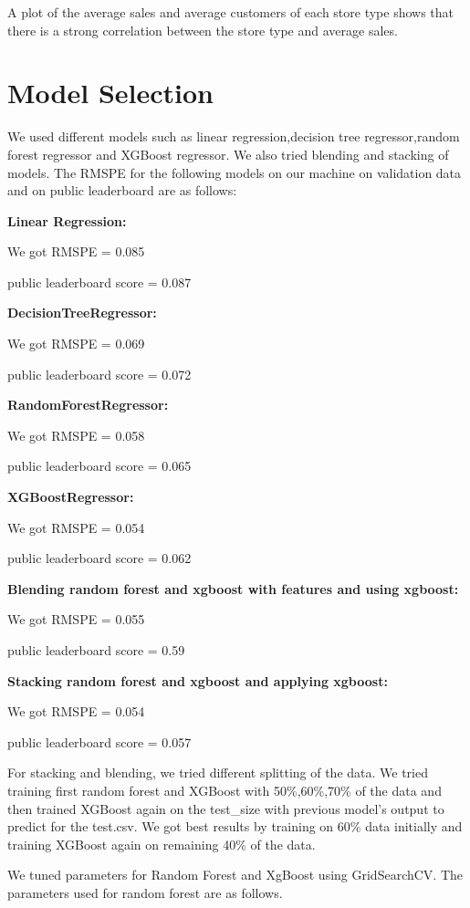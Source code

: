 \documentclass[letterpaper, 10 pt, conference]{ieeeconf}  %
\begin{document}
A plot of the average sales and average customers of each store type shows that there is a strong correlation between the store type and average sales.

\section{Model Selection}
We used different models such as linear regression,decision tree regressor,random forest regressor and XGBoost regressor. We also tried blending and stacking of models. The RMSPE for the following models on our machine on validation data and on public leaderboard are as follows:
\bigskip

\textbf{Linear Regression:}

We got RMSPE = 0.085

public leaderboard score = 0.087
\bigskip

\textbf{DecisionTreeRegressor:}

We got RMSPE = 0.069

public leaderboard score = 0.072
\bigskip

\textbf{RandomForestRegressor:}

We got RMSPE = 0.058

public leaderboard score = 0.065

\bigskip
\textbf{XGBoostRegressor:}

We got RMSPE = 0.054

public leaderboard score = 0.062

\bigskip
\textbf{Blending random forest and xgboost with features and using xgboost:}

We got RMSPE = 0.055

public leaderboard score = 0.59

\bigskip
\textbf{Stacking random forest and xgboost and applying xgboost:}

We got RMSPE = 0.054

public leaderboard score = 0.057

\bigskip

For stacking and blending, we tried different splitting of the data. We tried training first random forest and XGBoost with 50\%,60\%,70\% of the data and then trained XGBoost again on the test\_size with previous model's output to predict for the test.csv. We got best results by training on 60\% data initially and training XGBoost again on remaining 40\% of the data.  

\bigskip

We tuned parameters for Random Forest and XgBoost using GridSearchCV.
The parameters used for random forest are as follows.
\end{document}
